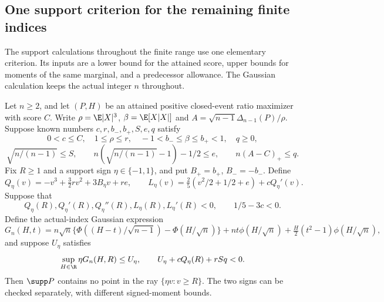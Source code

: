 \subsection{One support criterion for the remaining finite indices}
\label{j:finite:support}

The support calculations throughout the finite range use one elementary
criterion. Its inputs are a lower bound for the attained score, upper
bounds for moments of the same marginal, and a predecessor allowance.
The Gaussian calculation keeps the actual integer $n$ throughout.

\begin{lemma}
\label{j:finite:direct-gaussian-support-criterion}
Let $n\ge2$, and let $(P,H)$ be an attained positive closed-event
ratio maximizer with score $C$. Write
$\rho=\E|X|^3$, $\beta=\E[X|X|]$ and
$A=\sqrt{n-1}\Delta_{n-1}(P)/\rho$.
Suppose known numbers $c,r,b_-,b_+,S,e,q$ satisfy
\[
 0<c\le C,\quad 1\le\rho\le r,\quad
 -1<b_-\le\beta\le b_+<1,\quad q\ge0,
\]
\[
 \sqrt{n/(n-1)}\le S,\qquad
 n(\sqrt{n/(n-1)}-1)-1/2\le e,\qquad
 n(A-C)_+\le q.
\]
Fix $R\ge1$ and a support sign $\eta\in\{-1,1\}$, and put
$B_+=b_+$, $B_-=-b_-$. Define
\[
 Q_\eta(v)=-v^3+\tfrac32rv^2+3B_\eta v+re,
 \qquad
 L_\eta(v)=\tfrac25(v^2/2+1/2+e)+cQ_\eta'(v).
\]
Suppose that
\begin{equation}\label{j:finite:direct-support-ray-gates}
 Q_\eta(R),Q_\eta'(R),Q_\eta''(R),
 L_\eta(R),L_\eta'(R)<0,
 \qquad 1/5-3c<0.
\end{equation}
Define the actual-index Gaussian expression
\[
 G_n(H,t)=n\sqrt n\{\Phi((H-t)/\sqrt{n-1})-\Phi(H/\sqrt n)\}
 +nt\phi(H/\sqrt n)+\tfrac H2(t^2-1)\phi(H/\sqrt n),
\]
and suppose $U_\eta$ satisfies
\[
 \sup_{H\in\R}\eta G_n(H,R)\le U_\eta,
 \qquad U_\eta+cQ_\eta(R)+rSq<0.
\]
Then $\supp P$ contains no point in the ray
$\{\eta v:v\ge R\}$. The two signs can be checked separately,
with different signed-moment bounds.
\end{lemma}

